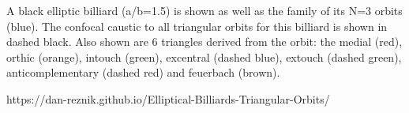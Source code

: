 A black elliptic billiard (a/b=1.5) is shown as well as the family of its N=3 orbits (blue). The confocal caustic to all triangular orbits for this billiard is shown in dashed black. Also shown are 6 triangles derived from the orbit: the medial (red), orthic (orange), intouch (green), excentral (dashed blue), extouch (dashed green), anticomplementary (dashed red) and feuerbach (brown).

https://dan-reznik.github.io/Elliptical-Billiards-Triangular-Orbits/